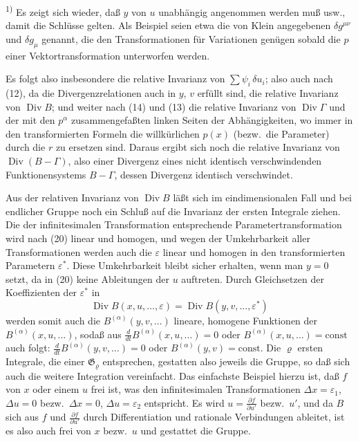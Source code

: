 \documentclass[12pt,a4paper]{article}
\begin{document}
\smallskip
\noindent\textsuperscript{1)} Es zeigt sich wieder, da\ss{} $y$ von $u$ unabh\"angig angenommen werden mu\ss{} usw., damit die Schl\"usse gelten. Als Beispiel seien etwa die von Klein angegebenen $\delta g^{\mu\nu}$ und $\delta g_{\mu}$ genannt, die den Transformationen f\"ur Variationen gen\"ugen sobald die $p$ einer Vektortransformation unterworfen werden.

Es folgt also insbesondere die relative Invarianz von $\sum\psi_{i}\,\delta u_{i}$; also auch nach (12), da die Divergenzrelationen auch in $y$, $v$ erf\"ullt sind, die relative Invarianz von $\operatorname{Div}B$; und weiter nach (14) und (13) die relative Invarianz von $\operatorname{Div}\varGamma$ und der mit den $p^{\alpha}$ zusammengefa\ss{}ten linken Seiten der Abh\"angigkeiten, wo immer in den transformierten Formeln die willk\"urlichen $p(x)$ (bezw.\ die Parameter) durch die $r$ zu ersetzen sind. Daraus ergibt sich noch die relative Invarianz von $\operatorname{Div}(B-\varGamma)$, also einer Divergenz eines nicht identisch verschwindenden Funktionensystems $B-\varGamma$, dessen Divergenz identisch verschwindet.

Aus der relativen Invarianz von $\operatorname{Div}B$ l\"a\ss{}t sich im eindimensionalen Fall und bei endlicher Gruppe noch ein Schlu\ss{} auf die Invarianz der ersten Integrale ziehen. Die der infinitesimalen Transformation entsprechende Parametertransformation wird nach (20) linear und homogen, und wegen der Umkehrbarkeit aller Transformationen werden auch die $\varepsilon$ linear und homogen in den transformierten Parametern $\varepsilon^{*}$. Diese Umkehrbarkeit bleibt sicher erhalten, wenn man $y=0$ setzt, da in (20) keine Ableitungen der $u$ auftreten. Durch Gleichsetzen der Koeffizienten der $\varepsilon^{*}$ in
\[
\operatorname{Div}B(x,u,\ldots,\varepsilon)=\operatorname{Div}B(y,v,\ldots,\varepsilon^{*})
\]
werden somit auch die $B^{(\alpha)}(y,v,\ldots)$ lineare, homogene Funktionen der $B^{(\alpha)}(x,u,\ldots)$, soda\ss{} aus $\tfrac{d}{dt}B^{(\alpha)}(x,u,\ldots)=0$ oder $B^{(\alpha)}(x,u,\ldots)=\mathrm{const}$ auch folgt: $\tfrac{d}{dt}B^{(\alpha)}(y,v,\ldots)=0$ oder $B^{(\alpha)}(y,v)=\mathrm{const}$. Die $\varrho$ ersten Integrale, die einer $\mathfrak{G}_{\varrho}$ entsprechen, gestatten also jeweils die Gruppe, so da\ss{} sich auch die weitere Integration vereinfacht. Das einfachste Beispiel hierzu ist, da\ss{} $f$ von $x$ oder einem $u$ frei ist, was den infinitesimalen Transformationen $\Delta x=\varepsilon_{1}$, $\Delta u=0$ bezw.\ $\Delta x=0$, $\Delta u=\varepsilon_{2}$ entspricht. Es wird $u=\tfrac{\partial f}{\partial u'}$ bezw.\ $u'$, und da $B$ sich aus $f$ und $\tfrac{\partial f}{\partial u'}$ durch Differentiation und rationale Verbindungen ableitet, ist es also auch frei von $x$ bezw.\ $u$ und gestattet die Gruppe.
\end{document}
